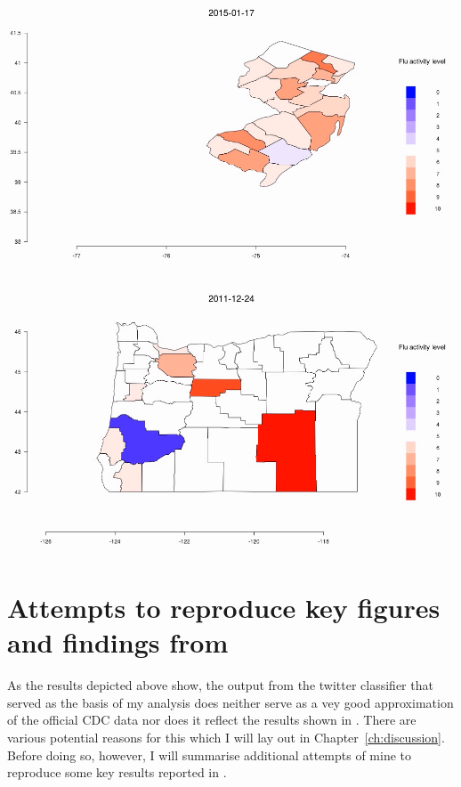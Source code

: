 \documentclass[11pt, a4paper,twoside]{report}\usepackage[]{graphicx}\usepackage[]{color}
\begin{document}
\begin{center} 
\href{run:vids/county_Twitter_cdc_diff_newjersey.avi}{\includegraphics[scale=0.5]{vids/Screenshot_Jersey.png}} 
\end{center}

\bigskip

\begin{center}
\href{run:vids/county_Twitter_cdc_diff_oregon.avi}{\includegraphics[scale=0.5]{vids/Screenshot_Oregon.png}} 
\end{center}

\section{Attempts to reproduce key figures and findings from \cite{bodnar_data_2015}}
\label{sec:methods_reproduce}
As the results depicted above show, the output from the twitter classifier that served as the basis of my analysis does neither serve as a vey good approximation of the official CDC data nor does it reflect the results shown in \cite{bodnar_data_2015}. There are various potential reasons for this which I will lay out in Chapter~\ref{ch:discussion}. Before doing so, however, I will summarise additional attempts of mine to reproduce some key results reported in \cite{bodnar_data_2015}.
\end{document}
